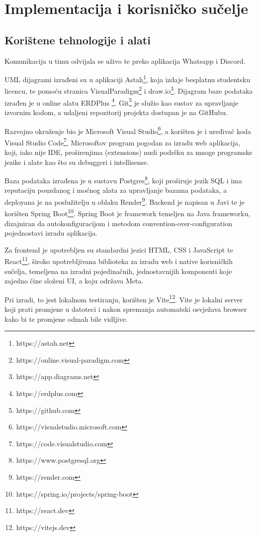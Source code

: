 \chapter{Implementacija i korisničko sučelje}
		
		
		\section{Korištene tehnologije i alati}
		
			Komunikacija u timu odvijala se uživo te preko aplikacija Whatsapp i Discord.

UML dijagrami izrađeni su u aplikaciji Astah\footnote{https://astah.net}, koja izdaje besplatnu studentsku licencu, te pomoću stranica VisualParadigm\footnote{https://online.visual-paradigm.com} i draw.io\footnote{https://app.diagrams.net}. Dijagram baze podataka izrađen je u online alatu ERDPlus \footnote{https://erdplus.com}.
Git\footnote{https://github.com} je služio kao sustav za upravljanje izvornim kodom, a udaljeni repozitorij projekta dostupan je na GitHubu.

Razvojno okruženje bio je Microsoft Visual Studio\footnote{https://visualstudio.microsoft.com}, a korišten je i uređivač koda Visual Studio Code\footnote{https://code.visualstudio.com}, Microsoftov program pogodan za izradu web aplikacija, koji, iako nije IDE, proširenjima (extensions) nudi podršku za mnoge programske jezike i alate kao što su debuggeri i intellisense.

Baza podataka izrađena je u sustavu Postgres\footnote{https://www.postgresql.org}, koji proširuje jezik SQL i ima reputaciju pouzdanog i moćnog alata za upravljanje bazama podataka, a deployana je na poslužitelju u oblaku Render\footnote{https://render.com}. 
Backend je napisan u Javi te je korišten Spring Boot\footnote{https://spring.io/projects/spring-boot}. Spring Boot je framework temeljen na Java frameworku, dizajniran da autokonfiguracijom i metodom convention-over-configuration pojednostavi izradu aplikacija. 

Za frontend je upotrebljen su standardni jezici HTML, CSS i JavaScript te React\footnote{https://react.dev}, široko upotrebljivana biblioteka za izradu web i native korisničkih sučelja, temeljena na izradni pojedinačnih, jednostavnijih komponenti koje zajedno čine složeni UI, a koju održava Meta. 

Pri izradi, to jest lokalnom testiranju, korišten je Vite\footnote{https://vitejs.dev}. Vite je lokalni server koji prati promjene u datoteci i nakon spremanja automatski osvježava browser kako bi te promjene odmah bile vidljive.

